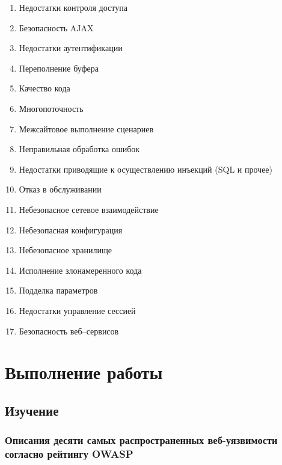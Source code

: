 \documentclass[utf8x, 12pt]{G7-32}
\begin{document}
\begin{enumerate}
	\item Недостатки контроля доступа
	\item Безопасность AJAX
	\item Недостатки аутентификации
	\item Переполнение буфера
	\item Качество кода
	\item Многопоточность
	\item Межсайтовое выполнение сценариев
	\item Неправильная обработка ошибок
	\item Недостатки приводящие к осуществлению инъекций (SQL и прочее)
	\item Отказ в обслуживании
	\item Небезопасное сетевое взаимодействие
	\item Небезопасная конфигурация
	\item Небезопасное хранилище
	\item Исполнение злонамеренного кода
	\item Подделка параметров
	\item Недостатки управление сессией
	\item Безопасность веб--сервисов
\end{enumerate}

\chapter{Выполнение работы}

\section{Изучение}
\subsection{Описания десяти самых распространенных веб-уязвимости согласно рейтингу OWASP}
\end{document}
